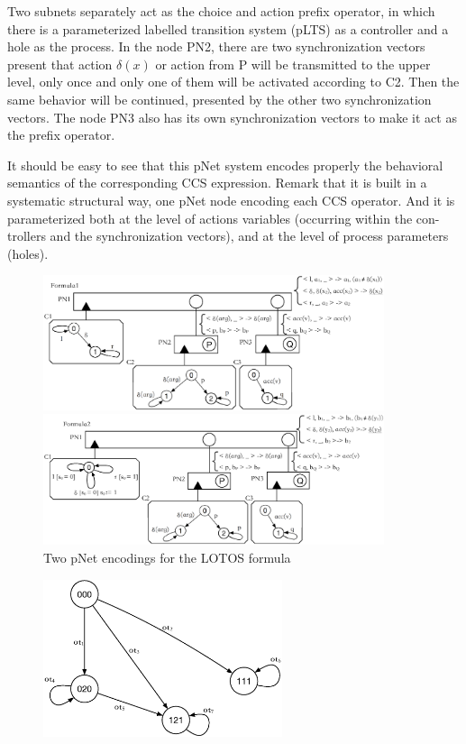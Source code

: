 \documentclass{lncs/llncs}
\newcommand{\QIN}[1]{\textcolor{airforceblue}{#1}}
\begin{document}
{\QIN{
Two subnets separately act as the choice and action prefix operator, in which there is a parameterized labelled transition system (pLTS) as a controller and a hole as the process. In the node PN2, there are two synchronization vectors present that action $\delta(x)$ or action from P will be transmitted to the upper level, only once and only one of them will be activated according to C2. Then the same behavior will be continued, presented by the other two synchronization vectors. The node PN3 also has its own synchronization vectors to make it act as the prefix operator.
}

\QIN{
It should be easy to see that this pNet system encodes properly the behavioral semantics of the corresponding CCS expression. Remark that it is built in a systematic structural way, one pNet node encoding each CCS operator. And it is parameterized both at the level of actions variables (occurring within the con- trollers and the synchronization vectors), and at the level of process parameters (holes).
}

\begin{figure}[h]
  \centerline{\includegraphics[width=10cm]{XFIG/LOTOS1.eps}}
  \hspace{0.5cm}
  \centerline{\includegraphics[width=10cm]{XFIG/LOTOS2.eps}}
  \caption{Two pNet encodings for the LOTOS formula }  \label{schema:lotos-pnet}
\end{figure}

\begin{figure}[h]
  \centerline{\includegraphics[width=7cm]{XFIG/LOTOSresult}}
  

\end{figure}}
\end{document}
